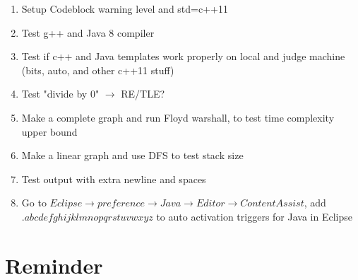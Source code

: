 \documentclass[10pt,oneside]{article}
\begin{document}
\begin{landscape}
\begin{multicols}{2}
{\normalsize
\begin{enumerate}
\item Setup Codeblock warning level and std=c++11
\item Test g++ and Java 8 compiler
\item Test if c++ and Java templates work properly on local and judge machine (bits, auto, and other c++11 stuff)
\item Test "divide by 0" $\rightarrow$ RE/TLE?
\item Make a complete graph and run Floyd warshall, to test time complexity upper bound
\item Make a linear graph and use DFS to test stack size
\item Test output with extra newline and spaces
\item Go to $Eclipse \rightarrow preference \rightarrow Java \rightarrow Editor \rightarrow Content Assist$, add $.abcdefghijklmnopqrstuvwxyz$ to auto activation triggers for Java in Eclipse
\end{enumerate}
}


\section{Reminder}



\end{multicols}
\end{landscape}
\end{document}
